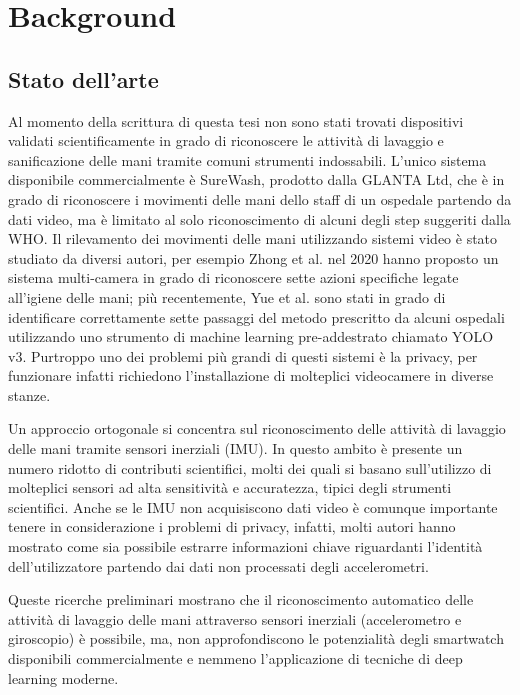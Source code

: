 \chapter{Background}
\label{cap:background}

\section{Stato dell'arte}
\label{sec:stato-dell-arte}

Al momento della scrittura di questa tesi non sono stati trovati dispositivi validati scientificamente in grado di riconoscere le attività di lavaggio e sanificazione delle mani tramite comuni strumenti indossabili. L'unico sistema disponibile commercialmente è SureWash, prodotto dalla GLANTA Ltd, che è in grado di riconoscere i movimenti delle mani dello staff di un ospedale partendo da dati video, ma è limitato al solo riconoscimento di alcuni degli step suggeriti dalla WHO.
Il rilevamento dei movimenti delle mani utilizzando sistemi video è stato studiato da diversi autori, per esempio Zhong et al. nel 2020 hanno proposto un sistema multi-camera in grado di riconoscere sette azioni specifiche legate all'igiene delle mani\cite{zhong2020multi}; più recentemente, Yue et al. sono stati in grado di identificare correttamente sette passaggi del metodo prescritto da alcuni ospedali utilizzando uno strumento di machine learning pre-addestrato chiamato YOLO v3\cite{yue2021intelligent}.
Purtroppo uno dei problemi più grandi di questi sistemi è la privacy, per funzionare infatti richiedono l'installazione di molteplici videocamere in diverse stanze.

Un approccio ortogonale si concentra sul riconoscimento delle attività di lavaggio delle mani tramite sensori inerziali (IMU). In questo ambito è presente un numero ridotto di contributi scientifici, molti dei quali si basano sull'utilizzo di molteplici sensori ad alta sensitività e accuratezza, tipici degli strumenti scientifici\cite{galluzzi2015hand}\cite{bal2017system}\cite{li2018wristwash}. 
Anche se le IMU non acquisiscono dati video è comunque importante tenere in considerazione i problemi di privacy, infatti, molti autori hanno mostrato come sia possibile estrarre informazioni chiave riguardanti l'identità dell'utilizzatore partendo dai dati non processati degli accelerometri\cite{jain2018gender}\cite{van2019systematic}.

Queste ricerche preliminari mostrano che il riconoscimento automatico delle attività di lavaggio delle mani attraverso sensori inerziali (accelerometro e giroscopio) è possibile, ma, non approfondiscono le potenzialità degli smartwatch disponibili commercialmente e nemmeno l'applicazione di tecniche di deep learning moderne.

